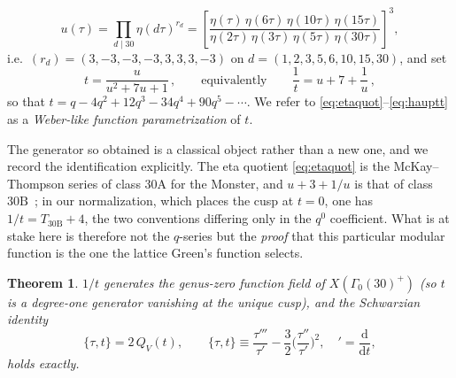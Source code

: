 \documentclass[11pt]{article}
\newcommand{\rmd}{\mathrm{d}}
\theoremstyle{plain}
\newtheorem{thm}{Theorem}[section]
\theoremstyle{remark}
\begin{document}
\begin{equation}
u(\tau)=\prod_{d\mid 30}\eta(d\tau)^{r_d}
=\left[\frac{\eta(\tau)\,\eta(6\tau)\,\eta(10\tau)\,\eta(15\tau)}
{\eta(2\tau)\,\eta(3\tau)\,\eta(5\tau)\,\eta(30\tau)}\right]^{3},
\label{eq:etaquot}
\end{equation}
i.e.\ $(r_d)=(3,-3,-3,-3,3,3,3,-3)$ on $d=(1,2,3,5,6,10,15,30)$, and set
\begin{equation}
t=\frac{u}{u^2+7u+1}\,,\qquad\text{equivalently}\qquad \frac1t=u+7+\frac1u\,,
\label{eq:hauptt}
\end{equation}
so that $t=q-4q^2+12q^3-34q^4+90q^5-\cdots$. We refer to
\eqref{eq:etaquot}--\eqref{eq:hauptt} as a \emph{Weber-like function parametrization} of $t$.

The generator so obtained is a classical object rather than a new one, and we record the
identification explicitly. The eta quotient \eqref{eq:etaquot} is the McKay--Thompson series of class
$30\mathrm{A}$ for the Monster, and $u+3+1/u$ is that of class $30\mathrm{B}$~\cite{FordMcKayNorton1994};
in our normalization, which places the cusp at $t=0$, one has $1/t=T_{30\mathrm{B}}+4$, the two
conventions differing only in the $q^0$ coefficient. What is at stake here is therefore not the
$q$-series but the \emph{proof} that this particular modular function is the one the lattice Green's
function selects.

\begin{thm}\label{thm:modular}
$1/t$ generates the genus-zero function field of $X(\Gamma_0(30)^+)$ (so $t$ is a degree-one
generator vanishing at the unique cusp), and the Schwarzian identity
\begin{equation}
\{\tau,t\}=2\,Q_V(t),\qquad
\{\tau,t\}\equiv\frac{\tau'''}{\tau'}-\frac32\Big(\frac{\tau''}{\tau'}\Big)^{\!2},
\quad{}'=\frac{\rmd}{\rmd t},
\label{eq:schwarz}
\end{equation}
holds exactly.
\end{thm}
\end{document}
